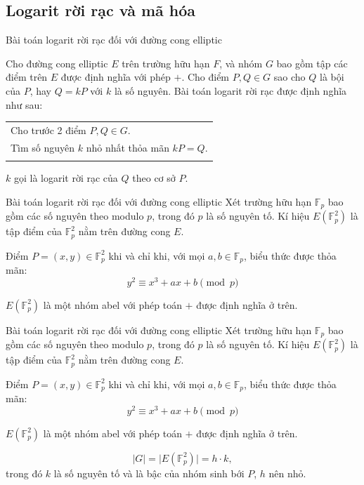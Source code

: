 \documentclass [xcolor=svgnames, t] {beamer}
\theoremstyle{definition}
\begin{document}
\subsection{Logarit rời rạc và mã hóa}
\begin{frame}{Bài toán logarit rời rạc đối với đường cong elliptic}
    \begin{definition}
        \label{define:3.1}
        Cho đường cong elliptic $E$ trên trường hữu hạn $F$, và nhóm $G$ bao gồm tập các điểm trên $E$ được định nghĩa với phép $+$. Cho điểm
        $P, Q \in G$ sao cho $Q$ là bội của $P$, hay $Q = kP$ với $k$ là số nguyên. Bài toán logarit rời rạc được định nghĩa như sau:

        \begin{tabular}{l}
            \\
            Cho trước 2 điểm $P, Q \in G$.                \\
            Tìm số nguyên $k$ nhỏ nhất thỏa mãn $kP = Q$. \\
            \\
        \end{tabular}

        $k$ gọi là logarit rời rạc của $Q$ theo cơ sở $P$.

    \end{definition}
\end{frame}

\begin{frame}{Bài toán logarit rời rạc đối với đường cong elliptic}
    Xét trường hữu hạn $\mathbb{F}_p$ bao gồm các số nguyên theo modulo $p$, trong đó $p$ là số nguyên tố.
    Kí hiệu $E(\mathbb{F}^2_p)$ là tập điểm của $\mathbb{F}^2_p$ nằm trên đường cong $E$.

    Điểm $P=(x,y) \in \mathbb{F}_p^2$ khi và chỉ khi, với mọi $a,b \in \mathbb{F}_p$, biểu thức được thỏa mãn:
    \begin{equation}
        \label{equation:3.8}
        y^2 \equiv x^3 + ax + b \pmod{p}
    \end{equation}

    $E(\mathbb{F}^2_p)$ là một nhóm abel với phép toán $+$ được định nghĩa ở trên.


\end{frame}
\begin{frame}{Bài toán logarit rời rạc đối với đường cong elliptic}
    Xét trường hữu hạn $\mathbb{F}_p$ bao gồm các số nguyên theo modulo $p$, trong đó $p$ là số nguyên tố.
    Kí hiệu $E(\mathbb{F}^2_p)$ là tập điểm của $\mathbb{F}^2_p$ nằm trên đường cong $E$.

    Điểm $P=(x,y) \in \mathbb{F}_p^2$ khi và chỉ khi, với mọi $a,b \in \mathbb{F}_p$, biểu thức được thỏa mãn:
    \begin{equation}
        y^2 \equiv x^3 + ax + b \pmod{p}
    \end{equation}

    $E(\mathbb{F}^2_p)$ là một nhóm abel với phép toán $+$ được định nghĩa ở trên.

    $$ \mid G \mid = \mid E(\mathbb{F}^2_p) \mid = h \cdot k,$$
    trong đó $k$ là số nguyên tố và là bậc của nhóm sinh bới $P$, $h$ nên nhỏ.
\end{frame}
\end{document}
